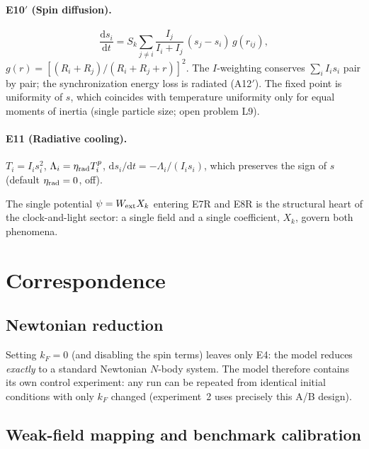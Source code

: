 \documentclass[aps,reprint,amsmath,amssymb,nofootinbib,superscriptaddress,floatfix]{revtex4-2}
\newcommand{\ud}{\mathrm{d}}
\newcommand{\Kt}{X_k}
\begin{document}
\paragraph*{E10$'$ (Spin diffusion).}
\begin{equation}
\frac{\ud s_i}{\ud t} = S_k\sum_{j\ne i}
 \frac{I_j}{I_i+I_j}\,(s_j-s_i)\,g(r_{ij}),
\label{eq:E10}
\end{equation}
$g(r) = [(R_i{+}R_j)/(R_i{+}R_j{+}r)]^2$.
The $I$-weighting conserves $\sum_i I_i s_i$ pair by pair; the
synchronization energy loss is radiated (A12$'$).
The fixed point is uniformity of $s$, which coincides with temperature
uniformity only for equal moments of inertia (single particle size;
open problem L9).

\paragraph*{E11 (Radiative cooling).}
$T_i = I_i s_i^2$, $\Lambda_i = \eta_{\rm rad}T_i^p$,
$\ud s_i/\ud t = -\Lambda_i/(I_i s_i)$, which preserves the sign of
$s$ (default $\eta_{\rm rad} = 0$, off).

The single potential $\psi = W_{\rm ext}\Kt$ entering E7R and E8R is
the structural heart of the clock-and-light sector: a single field and
a single coefficient, $\Kt$, govern both phenomena.

\section{Correspondence}
\label{sec:corr}

\subsection{Newtonian reduction}
\label{sec:newton}

Setting $k_F = 0$ (and disabling the spin terms) leaves only E4: the
model reduces \emph{exactly} to a standard Newtonian $N$-body system.
The model therefore contains its own control experiment: any run can be
repeated from identical initial conditions with only $k_F$ changed
(experiment~2 uses precisely this A/B design).

\subsection{Weak-field mapping and benchmark calibration}
\label{sec:calib}
\end{document}
